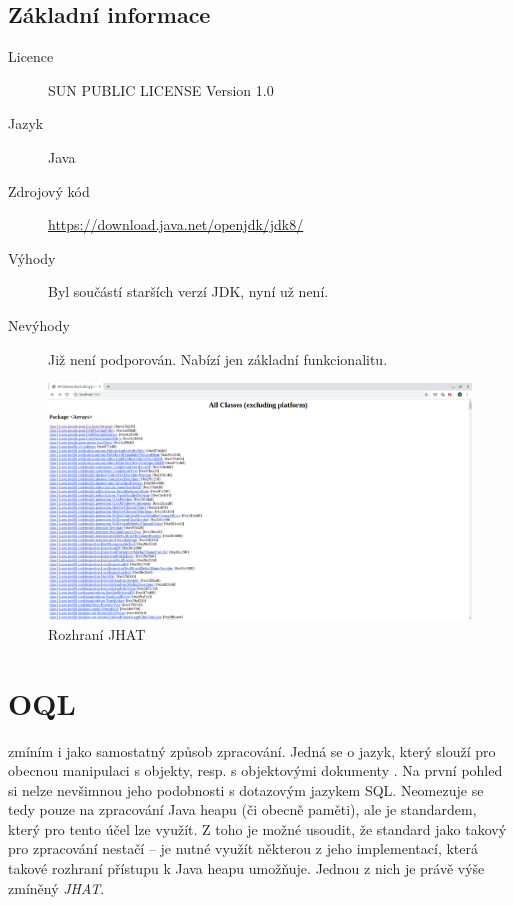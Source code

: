 \subsection{Základní informace}

\begin{description}
    \item[Licence] SUN PUBLIC LICENSE Version 1.0
    \item[Jazyk] Java
    \item[Zdrojový kód] \url{https://download.java.net/openjdk/jdk8/}
    \item[Výhody] Byl součástí starších verzí JDK, nyní už není.
    \item[Nevýhody] Již není podporován. Nabízí jen základní funkcionalitu.
\end{description}

\begin{figure}[ht!]
	\centering
	\includegraphics[scale=0.3]{obrazky/jhat.png}
	\caption{Rozhraní JHAT}
	\label{obr-jhat}
\end{figure}

\section{OQL}
 zmíním i jako samostatný způsob zpracování. Jedná se o jazyk, který slouží pro obecnou manipulaci s objekty, resp. s objektovými dokumenty \cite{odmgoql}\cite{oql}. Na první pohled si nelze nevšimnou jeho podobnosti s dotazovým jazykem SQL. Neomezuje se tedy pouze na zpracování Java heapu (či obecně paměti), ale je standardem, který pro tento účel lze využít. Z toho je možné usoudit, že standard jako takový pro zpracování nestačí -- je nutné využít některou z jeho implementací, která takové rozhraní přístupu k Java heapu umožňuje. Jednou z nich je právě výše zmíněný \textit{JHAT}.


